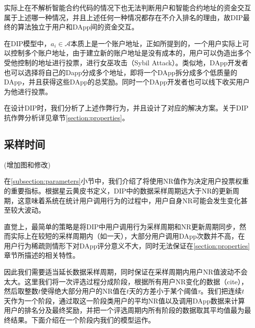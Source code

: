实际上在不解析智能合约代码的情况下也无法判断用户和智能合约地址的资金交互属于上述哪一种情况，并且上述任何一种情况都存在不介入排名的理由，故DIP最终的算法独立于用户和DApp间的资金交互。

在DIP模型中，$a_i \in \mathcal{A}$本质上是一个账户地址，正如\cite{Nabulasyellowpaper}所提到的，一个用户实际上可以控制多个账户地址，由于建立新的账户地址是没有成本的，用户可以伪造出多个受他控制的地址进行投票，进行女巫攻击（Sybil Attack）。类似地，DApp开发者也可以选择将自己的Dapp分成多个地址，即将一个DApp拆分成多个低质量的DApp，并且获得这些DApp的总奖励。同时一个DApp开发者也可以线下收买用户为他进行投票。

在设计DIP时，我们分析了上述作弊行为，并且设计了对应的解决方案。关于DIP抗作弊分析详见章节\ref{section:properties}。



\subsection{采样时间}
(增加图和修改)

在\ref{subsection:parameters}小节中，我们介绍了将使用NR值作为决定用户投票权重的重要指标。根据星云黄皮书定义\cite{Nabulasyellowpaper}，DIP中的数据采样周期远大于NR的更新周期，这意味着系统在统计用户调用行为的过程中，用户自身NR可能会发生变化甚至较大波动。

直觉上，最简单的策略是将DIP中用户调用行为采样周期和NR更新周期同步，然而实际上在较短的采样周期内（如一天），大部分用户调用DApp次数并不高，在用户行为稀疏则情形下对DApp评分意义不大，同时无法保证在\ref{section:properties}章节所描述的相关特性。

因此我们需要适当延长数据采样周期，同时保证在采样周期内用户NR值波动不会太大。这里我们将一次评选过程分成阶段，根据所有用户NR变化的数据（cite），然后取整数$t$使得绝大部分用户的NR值在$t$天的方差小于某个阈值$\tau$。我们把连续$t$天作为一个阶段，通过取这一阶段类用户的平均NR值以及调用DApp数据来计算用户的排名分及最终奖励，并把一个评选周期内所有阶段的数据取其平均值最为最终结果。下面介绍在一个阶段内我们的模型运作。


